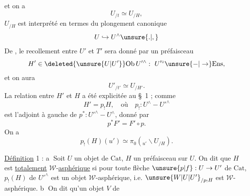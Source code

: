 
et on a
\[
 U_{/t}\simeq U_{/H},
\]
 $U_{/H}$ est interprété en termes du plongement
canonique
\[
 U\hookrightarrow U^\wedge\unsure{.|,}
\]
De , le recollement entre $U'$ et $T'$ sera donné par un préfaisceau
\[
 H'\in\deleted{\unsure{U|U'}}\mathrm{Ob}\,U'^\wedge:\ U'^\circ\unsure{-|\to}\mathrm{Ens},
\]
et on aura
\[
 U'_{/t'}\simeq U_{/H'}.
\]
La relation entre $H'$ et $H$ a été explicitée
au \S~1 ; comme
\[
 H'=p_!H,\quad\text{où}\quad p_!:U^\wedge-U'^\wedge
\]
est l'adjoint à gauche de $p^*:U'^\wedge-U^\wedge$,
donné par
\[
 p^*F'=F'\circ p.
\]
On a
\[
 p_!(H)(u')\simeq\pi_0({}_{u'}\backslash U_{/H}).
\]

\uline{Définition} 1 : \textcircled{a} Soit $U$ un objet de $\mathrm{Cat}$,
$H$  un préfaisceau sur $U$. On dit que  $H$
est \uline{totalement} $\mathcal W$-\uline{asphérique} si pour toute
flèche $\unsure{p|f}:U\to U'$ de $\mathrm{Cat}$, $p_!(H)$ de $U'^\wedge$
est un objet $\mathcal W$-asphérique, i.e. $\unsure{W|U|U'}_{/p_!H}$ est
$\mathcal W$-asphérique. \textcircled{b} On dit qu'un objet $V$ de

